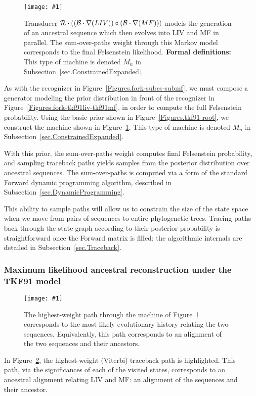 \documentclass{article}
\newcommand{\secref}[1]{Subsection~\ref{sec.#1}}
\newcommand{\figref}[1]{Figure~\ref{Figures.#1}}
\newcommand{\figlabel}[1]{\label{Figures.#1}}
\newcommand{\easyfig}[4]{
\begin{figure}
\texttt{[image: \#1]}
\caption{ \figlabel{#3} #4}
\end{figure}}
\newcommand{\widepngfig}[2]{\easyfig{#1.png}{width=\textwidth}{#1}{#2}}
\newcommand\tkf{{\cal B}}
\newcommand\tkfroot{{\cal R}}
\newcommand\formaldefs{{\bf Formal definitions: }}
\newcommand\fork{\circ}
\newcommand\recognize{\nabla}
\begin{document}
\widepngfig{root-fork-tkf91liv-tkf91mf}{Transducer $\tkfroot \cdot ((\tkf \cdot \recognize(LIV))\fork(\tkf \cdot \recognize(MF)))$ models the generation of an ancestral sequence which then evolves into LIV and MF in parallel.  
The sum-over-paths weight through this Markov model corresponds to the final Felsenstein likelihood. 
\formaldefs
This type of machine is denoted $M_n$ in \secref{ConstrainedExpanded}.  
}

As with the recognizer in \figref{fork-subcs-submf},
we must compose a generator modeling the prior distribution in front of the recognizer in \figref{fork-tkf91liv-tkf91mf}, in order to compute
the full Felsenstein probability.  
Using the basic prior shown in \figref{tkf91-root}, we construct the machine shown
in \figref{root-fork-tkf91liv-tkf91mf}.  
This type of machine is denoted $M_n$ in \secref{ConstrainedExpanded}.  

With this prior, the sum-over-paths weight computes final Felsenstein probability, and 
sampling traceback paths yields samples from the  posterior distribution 
over ancestral sequences.  
The sum-over-paths is computed via a form of the standard Forward dynamic programming
algorithm, described in \secref{DynamicProgramming}.  

This ability to sample paths will allow us to constrain
the size of the state space when we move from  pairs of 
sequences to entire phylogenetic trees.  
Tracing paths back through the state graph according to their posterior probability
is straightforward once the Forward matrix is filled; 
the algorithmic internals are detailed in \secref{Traceback}. 



\subsubsection{Maximum likelihood ancestral reconstruction under the TKF91 model}

\widepngfig{viterbi-root-fork-tkf91liv-tkf91mf}{The highest-weight path through
the machine of \figref{root-fork-tkf91liv-tkf91mf}
 corresponds to the most likely evolutionary history relating the two sequences.  
Equivalently, this path corresponds to an alignment of the two sequences and their 
ancestors.}

In \figref{viterbi-root-fork-tkf91liv-tkf91mf}, the highest-weight (Viterbi) traceback path
is highlighted.  
This path, via the significances of each of the visited states, corresponds to 
an ancestral alignment relating LIV and MF: an alignment of the sequences and their ancestor.
\end{document}
